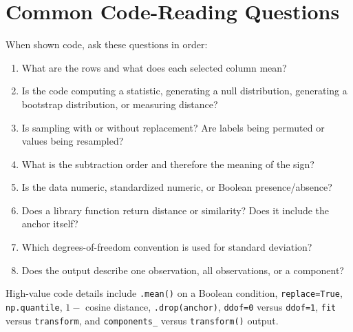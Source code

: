 \documentclass[11pt]{article}
\begin{document}
\section{Common Code-Reading Questions}
When shown code, ask these questions in order:
\begin{enumerate}
	\item What are the rows and what does each selected column mean?
	\item Is the code computing a statistic, generating a null distribution, generating a bootstrap distribution, or measuring distance?
	\item Is sampling with or without replacement? Are labels being permuted or values being resampled?
	\item What is the subtraction order and therefore the meaning of the sign?
	\item Is the data numeric, standardized numeric, or Boolean presence/absence?
	\item Does a library function return distance or similarity? Does it include the anchor itself?
	\item Which degrees-of-freedom convention is used for standard deviation?
	\item Does the output describe one observation, all observations, or a component?
\end{enumerate}
High-value code details include \texttt{.mean()} on a Boolean condition, \texttt{replace=True}, \texttt{np.quantile}, $1-$ cosine distance, \texttt{.drop(anchor)}, \texttt{ddof=0} versus \texttt{ddof=1}, \texttt{fit} versus \texttt{transform}, and \texttt{components\_} versus \texttt{transform()} output.
\end{document}
